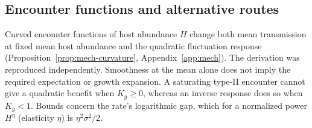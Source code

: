 \subsection{Encounter functions and alternative routes}
Curved encounter functions of host abundance $H$ change both mean transmission at fixed mean host abundance and the quadratic fluctuation response (Proposition~\ref{prop:mech-curvature}, Appendix~\ref{app:mech}).
The derivation was reproduced independently. Smoothness at the mean alone does not imply the required expectation or growth expansion. A saturating type-II encounter cannot give a quadratic benefit when \(K_g\geq0\), whereas an inverse response does so when \(K_g<1\). Bounds concern the rate's logarithmic gap, which for a normalized power \(H^\eta\) (elasticity \(\eta\)) is \(\eta^2\sigma^2/2\).

